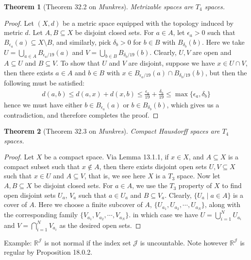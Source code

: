 \documentclass[11pt]{book}
\theoremstyle{break}
\theoremstyle{break}
\newtheorem{thm}{Theorem}[section]
\newcommand{\R}{\mathbb{R}}
\newcommand{\example}{\color{green}Example: \color{black}}
\begin{document}
\begin{thm}[Theorem 32.2 on \textit{Munkres}]
Metrizable spaces are $T_4$ spaces. 
\end{thm}
\begin{proof}
Let $(X,d)$ be a metric space equipped with the topology induced by metric $d$. Let $A,B \subseteq X$ be disjoint closed sets. For $a \in A$, let $\epsilon_a >0$ such that $B_{\epsilon_a}(a) \subseteq X\setminus B$, and similarly, pick $\delta_b >0$ for $b \in B$ with $B_{\delta_b}(b)$. Here we take $U = \bigcup_{a \in A}B_{\epsilon_a/19}(a)$ and $V = \bigcup_{b \in B} B_{\delta_b/19}(b)$. Clearly, $U,V$ are open and $A \subseteq U$ and $B \subseteq V$. To show that $U$ and $V$ are disjoint, suppose we have $x \in U \cap V$, then there exists $a\in A$ and $b \in B$ with $x \in B_{\epsilon_a/19}(a)\cap B_{\delta_b/19}(b)$, but then the following must be satisfied:
\begin{align*}
d(a,b) \leq d(a,x) + d(x,b) \leq \frac{\epsilon_a}{19} + \frac{\delta_b}{19} \leq \max\{\epsilon_a,\delta_b\}
\end{align*}
hence we must have either $b \in B_{\epsilon_a}(a)$ or $b \in B_{\delta_b}(b)$, which gives us a contradiction, and therefore completes the proof. 
\end{proof}

\begin{thm}[Theorem 32.3 on \textit{Munkres}]
Compact Hausdorff spaces are $T_4$ spaces. 
\end{thm}
\begin{proof}
Let $X$ be a compact space. Via Lemma 13.1.1, if $x \in X$, and $A\subseteq X$ is a compact subset such that $x \notin A$, then there exists disjoint open sets $U,V \subseteq X$ such that $x \in U$ and $A\subseteq V$, that is, we see here $X$ is a $T_3$ space. Now let $A,B \subseteq X$ be disjoint closed sets. For $a \in A$, we use the $T_3$ property of $X$ to find open disjoint sets $U_a$, $V_a$ such that $a \in U_a$ and $B \subseteq V_a$. Clearly, $\{U_a\mid a \in A\}$ is a cover of $A$. Here we choose a finite subcover of $A$, $\{U_{a_1}, U_{a_2},\cdots, U_{a_N}\}$, along with the corresponding family $\{V_{a_1}, V_{a_2},\cdots, V_{a_N}\}$. in which case we have $U = \bigcup_{i=1}^N U_{a_i}$ and $V = \bigcap_{i=1}^NV_{a_i}$ as the desired open sets.
\end{proof}

\example $\R^\mathcal{J}$ is not normal if the index set $\mathcal{J}$ is uncountable. Note however $\R^{\mathcal{J}}$ is regular by Proposition 18.0.2. \\
\end{document}
